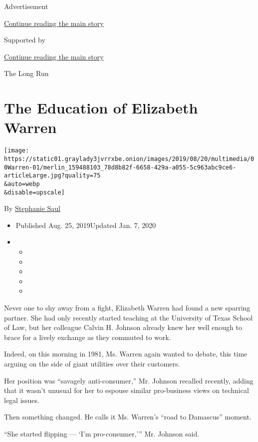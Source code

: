Advertisement

\protect\hyperlink{after-top}{Continue reading the main story}

Supported by

\protect\hyperlink{after-sponsor}{Continue reading the main story}

The Long Run

\hypertarget{the-education-of-elizabeth-warren}{%
\section{The Education of Elizabeth
Warren}\label{the-education-of-elizabeth-warren}}

\texttt{[image: https://static01.graylady3jvrrxbe.onion/images/2019/08/20/multimedia/00Warren-01/merlin\_159488103\_78d8b82f-6658-429a-a055-5c963abc9ce6-articleLarge.jpg?quality=75\\\&auto=webp\\\&disable=upscale]}

By \href{https://www.nytimes3xbfgragh.onion/by/stephanie-saul}{Stephanie
Saul}

\begin{itemize}
\item
  Published Aug. 25, 2019Updated Jan. 7, 2020
\item
  \begin{itemize}
  \item
  \item
  \item
  \item
  \item
  \end{itemize}
\end{itemize}

Never one to shy away from a fight, Elizabeth Warren had found a new
sparring partner. She had only recently started teaching at the
University of Texas School of Law, but her colleague Calvin H. Johnson
already knew her well enough to brace for a lively exchange as they
commuted to work.

Indeed, on this morning in 1981, Ms. Warren again wanted to debate, this
time arguing on the side of giant utilities over their customers.

Her position was ``savagely anti-consumer,'' Mr. Johnson recalled
recently, adding that it wasn't unusual for her to espouse similar
pro-business views on technical legal issues.

Then something changed. He calls it Ms. Warren's ``road to Damascus''
moment.

``She started flipping --- `I'm pro-consumer,''' Mr. Johnson said.

